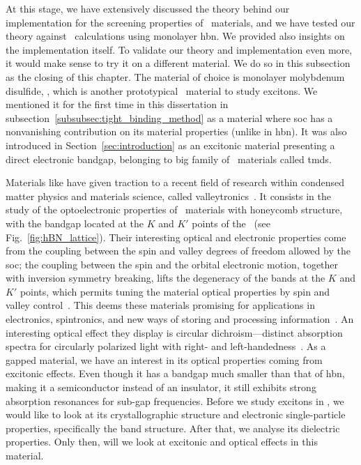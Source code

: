 At this stage, we have extensively discussed the theory behind our implementation for the screening properties of \bd~materials, and we have tested our theory against \abinit~calculations using monolayer \gls{hbn}.
We provided also insights on the implementation itself.
To validate our theory and implementation even more, it would make sense to try it on a different material.
We do so in this subsection as the closing of this chapter.
The material of choice is monolayer molybdenum disulfide, , which is another prototypical \bd~material to study excitons.
We mentioned it for the first time in this dissertation in subsection~\ref{subsubsec:tight_binding_method} as a material where \gls{soc} has a nonvanishing contribution on its material properties (unlike in \gls{hbn}).
It was also introduced in Section~\ref{sec:introduction} as an excitonic material presenting a direct electronic bandgap, belonging to big family of \bd~materials called \glspl{tmd}.

Materials like  have given traction to a recent field of research within condensed matter physics and materials science, called valleytronics~\cite{PhysRevLett.108.196802,Mak_Xiao_Shan_2018}.
It consists in the study of the optoelectronic properties of \bd~materials with honeycomb structure, with the bandgap located at the $K$ and $K'$ points of the \bz~(see Fig.~\ref{fig:hBN_lattice}).
Their interesting optical and electronic properties come from the coupling between the spin and valley degrees of freedom allowed by the \gls{soc}; the coupling between the spin and the orbital electronic motion, together with inversion symmetry breaking, lifts the degeneracy of the bands at the $K$ and $K'$ points, which permits tuning the material optical properties by spin and valley control~\cite{PhysRevLett.108.196802}.
This deems these materials promising for applications in electronics, spintronics, and new ways of storing and processing information~\cite{Mak_Xiao_Shan_2018}.
An interesting optical effect they display is circular dichroism---distinct absorption spectra for circularly polarized light with right- and left-handedness~\cite{Cao_Wang_Han_2012,Morozov_Wolff_Mortensen_2021,Sivaram_Hanbicki_Rosenberger_Jernigan_Chuang_McCreary_Jonker_2019}.
As a gapped material, we have an interest in its optical properties coming from excitonic effects.
Even though it has a bandgap much smaller than that of \gls{hbn}, making it a semiconductor instead of an insulator, it still exhibits strong absorption resonances for sub-gap frequencies.
Before we study excitons in , we would like to look at its crystallographic structure and electronic single-particle properties, specifically the band structure.
After that, we analyse its dielectric properties.
Only then, will we look at excitonic and optical effects in this material.

